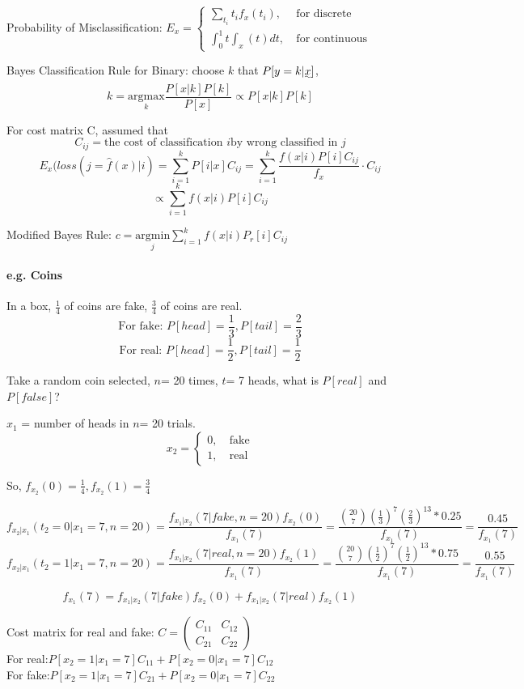 \documentclass{article}
\begin{document}
{    Probability of Misclassification: \(E_x= \begin{cases}
        \sum_{t_i}t_if_x(t_i), &\   \text{for discrete} \\
        \int_{0}^{1}t\int_{x}(t)dt, &\  \text{for continuous}
    \end{cases}\)

    Bayes Classification Rule for Binary: choose $k$ that \(P[y=k|\uwave{x}]\),
    \[k= \underset{k}{\mathrm{argmax}}\frac{P[x|k]P[k]}{P[x]} \propto P[x|k]P[k]\]

    For cost matrix C, assumed that
    \[C_{ij}= \text{the cost of classification } i \text{by wrong classified in } j\]
    \[E_x(loss(j=\hat{f}(x)|i)= \sum_{i=1}^{k}P[i|x]C_{ij} = \sum_{i=1}^{k}\frac{f(x|i)P[i]C_{ij}}{f_x} \cdot C_{ij}\]
    \[ \propto \sum_{i=1}^{k}f(x|i)P[i]C_{ij}\]

    Modified Bayes Rule: \(c= \underset{j}{\mathrm{argmin}}\sum_{i=1}^{k}f(x|i)P_r[i]C_{ij}\)

    \paragraph{e.g. Coins}{
        In a box, $\frac{1}{4}$ of coins are fake, $\frac{3}{4} $ of coins are real.
        \[\text{For fake: } P[head]= \frac{1}{3}, P[tail]= \frac{2}{3} \]
        \[\text{For real: } P[head]= \frac{1}{2}, P[tail]= \frac{1}{2} \]

        Take a random coin selected, $n$= 20 times, $t$= 7 heads, what is $P[real]$ and $P[false]$?

        $x_1$ = number of heads in $n$= 20 trials.
        \[x_2= \begin{cases} 
            0,  &\   \text{fake}\\ 
            1,  &\   \text{real}
        \end{cases}\]

        So, \(f_{x_2}(0)=\frac{1}{4}, f_{x_2}(1)=\frac{3}{4}\)

        \[f_{x_2|x_1}(t_2= 0|x_1=7, n= 20)=\frac{f_{x_1|x_2}(7|fake, n= 20)f_{x_2}(0)}{f_{x_1}(7)}=\frac{{20\choose 7}(\frac{1}{3})^7(\frac{2}{3})^{13}*0.25}{f_{x_1}(7)}=\frac{0.45}{f_{x_1}(7)}\]
        \[f_{x_2|x_1}(t_2= 1|x_1=7, n= 20)=\frac{f_{x_1|x_2}(7|real, n= 20)f_{x_2}(1)}{f_{x_1}(7)}=\frac{{20\choose 7}(\frac{1}{2})^7(\frac{1}{2})^{13}*0.75}{f_{x_1}(7)}=\frac{0.55}{f_{x_1}(7)}\]

        \[f_{x_1}(7)=f_{x_1|x_2}(7|fake)f_{x_2}(0)+f_{x_1|x_2}(7|real)f_{x_2}(1)\]

        Cost matrix for real and fake: \(C=\begin{pmatrix}
            C_{11} & C_{12} \\
            C_{21} & C_{22}
        \end{pmatrix}\)\\

        For real:\(P[x_2=1|x_1=7]C_{11}+P[x_2=0|x_1=7]C_{12}\)\\

        For fake:\(P[x_2=1|x_1=7]C_{21}+P[x_2=0|x_1=7]C_{22}\)\\
    }
}
\end{document}
